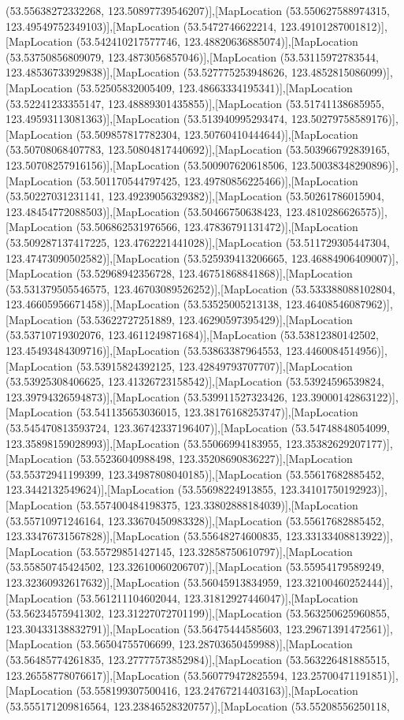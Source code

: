 (53.55638272332268, 123.50897739546207)],[MapLocation (53.550627588974315, 123.49549752349103)],[MapLocation (53.5472746622214, 123.49101287001812)],[MapLocation (53.542410217577746, 123.48820636885074)],[MapLocation (53.53750856809079, 123.4873056857046)],[MapLocation (53.53115972783544, 123.48536733929838)],[MapLocation (53.527775253948626, 123.4852815086099)],[MapLocation (53.52505832005409, 123.48663334195341)],[MapLocation (53.52241233355147, 123.48889301435855)],[MapLocation (53.51741138685955, 123.49593113081363)],[MapLocation (53.513940995293474, 123.50279758589176)],[MapLocation (53.509857817782304, 123.50760410444644)],[MapLocation (53.50708068407783, 123.50804817440692)],[MapLocation (53.503966792839165, 123.50708257916156)],[MapLocation (53.500907620618506, 123.50038348290896)],[MapLocation (53.501170544797425, 123.49780856225466)],[MapLocation (53.50227031231141, 123.49239056329382)],[MapLocation (53.50261786015904, 123.48454772088503)],[MapLocation (53.50466750638423, 123.4810286626575)],[MapLocation (53.506862531976566, 123.47836791131472)],[MapLocation (53.509287137417225, 123.4762221441028)],[MapLocation (53.511729305447304, 123.47473090502582)],[MapLocation (53.525939413206665, 123.46884906409007)],[MapLocation (53.52968942356728, 123.46751868841868)],[MapLocation (53.531379505546575, 123.46703089526252)],[MapLocation (53.533388088102804, 123.46605956671458)],[MapLocation (53.53525005213138, 123.46408546087962)],[MapLocation (53.53622727251889, 123.46290597395429)],[MapLocation (53.53710719302076, 123.4611249871684)],[MapLocation (53.53812380142502, 123.45493484309716)],[MapLocation (53.53863387964553, 123.4460084514956)],[MapLocation (53.53915824392125, 123.42849793707707)],[MapLocation (53.53925308406625, 123.41326723158542)],[MapLocation (53.53924596539824, 123.39794326594873)],[MapLocation (53.539911527323426, 123.39000142863122)],[MapLocation (53.541135653036015, 123.38176168253747)],[MapLocation (53.545470813593724, 123.36742337196407)],[MapLocation (53.54748848054099, 123.35898159028993)],[MapLocation (53.55066994183955, 123.35382629207177)],[MapLocation (53.55236040988498, 123.35208690836227)],[MapLocation (53.55372941199399, 123.34987808040185)],[MapLocation (53.55617682885452, 123.3442132549624)],[MapLocation (53.55698224913855, 123.34101750192923)],[MapLocation (53.557400484198375, 123.33802888184039)],[MapLocation (53.55710971246164, 123.33670450983328)],[MapLocation (53.55617682885452, 123.33476731567828)],[MapLocation (53.55648274600835, 123.33133408813922)],[MapLocation (53.55729851427145, 123.32858750610797)],[MapLocation (53.55850745424502, 123.32610060206707)],[MapLocation (53.55954179589249, 123.32360932617632)],[MapLocation (53.56045913834959, 123.32100460252444)],[MapLocation (53.561211104602044, 123.31812927446047)],[MapLocation (53.56234575941302, 123.31227072701199)],[MapLocation (53.563250625960855, 123.30433138832791)],[MapLocation (53.56475444585603, 123.29671391472561)],[MapLocation (53.56504755706699, 123.28703650459988)],[MapLocation (53.56485774261835, 123.27777573852984)],[MapLocation (53.563226481885515, 123.26558778076617)],[MapLocation (53.560779472825594, 123.25700471191851)],[MapLocation (53.558199307500416, 123.24767214403163)],[MapLocation (53.555171209816564, 123.23846528320757)],[MapLocation (53.55208556250118, 
